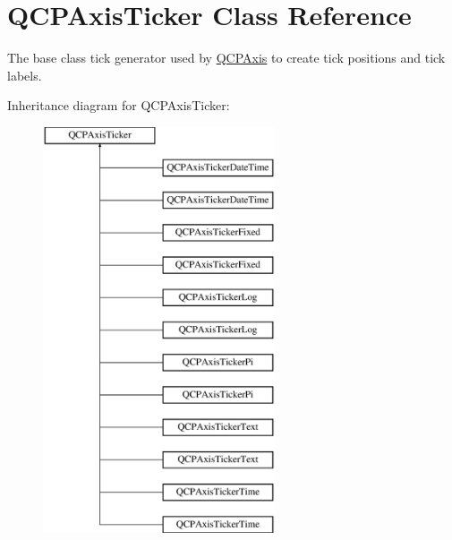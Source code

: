 \hypertarget{class_q_c_p_axis_ticker}{}\section{Q\+C\+P\+Axis\+Ticker Class Reference}
\label{class_q_c_p_axis_ticker}


The base class tick generator used by \hyperlink{class_q_c_p_axis}{Q\+C\+P\+Axis} to create tick positions and tick labels.  


Inheritance diagram for Q\+C\+P\+Axis\+Ticker\+:\begin{figure}[H]
\begin{center}
\leavevmode
\includegraphics[height=12.000000cm]{class_q_c_p_axis_ticker}
\end{center}
\end{figure}
